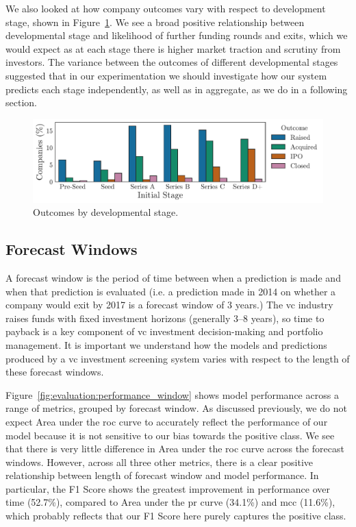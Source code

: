 \documentclass[../thesis/thesis.tex]{subfiles}
\begin{document}
We also looked at how company outcomes vary with respect to development stage, shown in Figure~\ref{fig:evaluation:outcome_stage}. We see a broad positive relationship between developmental stage and likelihood of further funding rounds and exits, which we would expect as at each stage there is higher market traction and scrutiny from investors. The variance between the outcomes of different developmental stages suggested that in our experimentation we should investigate how our system predicts each stage independently, as well as in aggregate, as we do in a following section.

\begin{figure}[!htb]
    \centering
    \includegraphics[width=\textwidth]{../figures/evaluation/outcomes_stage}
    \caption[Outcomes by developmental stage]{Outcomes by developmental stage.}
    \label{fig:evaluation:outcome_stage}
\end{figure}

\subsection{Forecast Windows}

A forecast window is the period of time between when a prediction is made and when that prediction is evaluated (i.e. a prediction made in 2014 on whether a company would exit by 2017 is a forecast window of 3 years.) The \gls{vc} industry raises funds with fixed investment horizons (generally 3--8 years), so time to payback is a key component of \gls{vc} investment decision-making and portfolio management. It is important we understand how the models and predictions produced by a \gls{vc} investment screening system varies with respect to the length of these forecast windows.

Figure~\ref{fig:evaluation:performance_window} shows model performance across a range of metrics, grouped by forecast window. As discussed previously, we do not expect Area under the \gls{roc} curve to accurately reflect the performance of our model because it is not sensitive to our bias towards the positive class. We see that there is very little difference in Area under the \gls{roc} curve across the forecast windows. However, across all three other metrics, there is a clear positive relationship between length of forecast window and model performance. In particular, the F1 Score shows the greatest improvement in performance over time (52.7\%), compared to Area under the \gls{pr} curve (34.1\%) and \gls{mcc} (11.6\%), which probably reflects that our F1 Score here purely captures the positive class.
\end{document}
